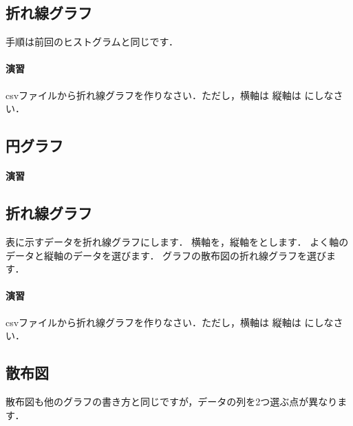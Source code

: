 \subsection{折れ線グラフ}

手順は前回のヒストグラムと同じです．

\paragraph{演習}
csvファイルから折れ線グラフを作りなさい．ただし，横軸は 縦軸は にしなさい．

\subsection{円グラフ}

\paragraph{演習}


\subsection{折れ線グラフ}

表に示すデータを折れ線グラフにします．
横軸を，縦軸をとします．
よく軸のデータと縦軸のデータを選びます．
グラフの散布図の折れ線グラフを選びます．

\paragraph{演習}

csvファイルから折れ線グラフを作りなさい．ただし，横軸は 縦軸は にしなさい．

\subsection{散布図}

散布図も他のグラフの書き方と同じですが，データの列を2つ選ぶ点が異なります．

